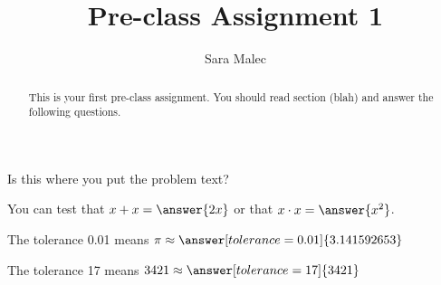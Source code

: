 \documentclass{ximera}
\title{Pre-class Assignment 1}
\author{Sara Malec}
\begin{document}
\begin{abstract}
  This is your first pre-class assignment. You should read section (blah) and answer the following questions.
\end{abstract}
\maketitle


\begin{problem} Is this where you put the problem text?
\begin{multipleChoice}
\end{multipleChoice}
\end{problem}

\begin{problem}
   You can test that $x + x = \answer{2x}$ or that $x \cdot x = \answer{x^2}$.
\end{problem}

\begin{problem}
   The tolerance 0.01 means $\pi \approx \answer[tolerance=0.01]{3.141592653}$
\end{problem}

\begin{problem}
   The tolerance 17 means $3421 \approx \answer[tolerance=17]{3421}$
\end{problem}
\end{document}
